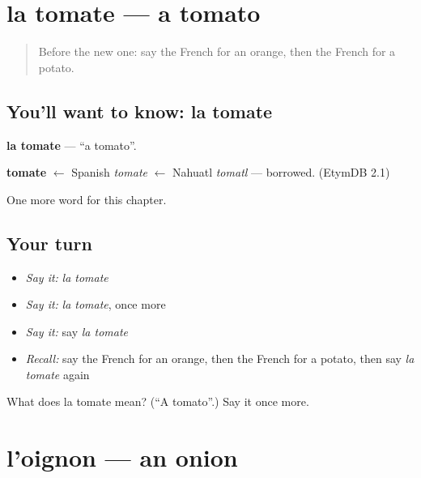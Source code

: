 \section[la tomate]{la tomate — a tomato}

\label{lesson:FR-C68-tomate}



\begin{quote}
Before the new one: say the French for an orange, then the French for a potato.
\end{quote}

\subsection*{You'll want to know: la tomate}
\textbf{la tomate} — \textquotedblleft{}a tomato\textquotedblright{}.

\begin{cousinweb}
\textbf{tomate} $\leftarrow$ Spanish \emph{tomate} $\leftarrow$ Nahuatl \emph{tomatl} — borrowed. (EtymDB 2.1)
\end{cousinweb}

\begin{grammarlens}[title={What you've built}]
One more word for this chapter.
\end{grammarlens}

\subsection*{Your turn}
\begin{itemize}
\raggedright
  \item \emph{Say it:} \emph{la tomate}
  \item \emph{Say it:} \emph{la tomate}, once more
  \item \emph{Say it:} say \emph{la tomate}
  \item \emph{Recall:} say the French for an orange, then the French for a potato, then say \emph{la tomate} again
\end{itemize}

\begin{tcolorbox}[breakable,colback=teal!4,colframe=teal!35!black,title={Before you move on}]
What does la tomate mean? (\textquotedblleft{}A tomato\textquotedblright{}.) Say it once more.
\end{tcolorbox}
\section[l'oignon]{l'oignon — an onion}

